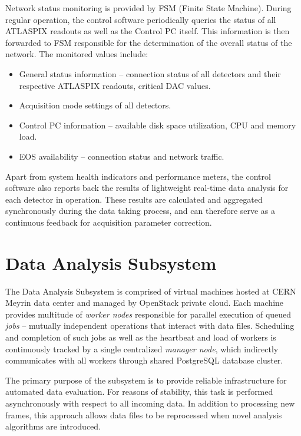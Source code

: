 \documentclass[journal]{IEEEtran}
\begin{document}
Network status monitoring is provided by FSM (Finite State Machine). During regular operation, the control software periodically queries the status of all ATLASPIX readouts as well as the Control PC itself. This information is then forwarded to FSM responsible for the determination of the overall status of the network. The monitored values include:
~
\begin{itemize}
  \item General status information -- connection status of all detectors and their respective ATLASPIX readouts, critical DAC values.
  \item Acquisition mode settings of all detectors.
  \item Control PC information -- available disk space utilization, CPU and memory load.
  \item EOS availability -- connection status and network traffic.
\end{itemize}

Apart from system health indicators and performance meters, the control software also reports back the results of lightweight real-time data analysis for each detector in operation. These results are calculated and aggregated synchronously during the data taking process, and can therefore serve as a continuous feedback for acquisition parameter correction.


\section{\label{sec:analysis}Data Analysis Subsystem}
The Data Analysis Subsystem is comprised of virtual machines hosted at CERN Meyrin data center and managed by OpenStack private cloud. Each machine provides multitude of \textit{worker nodes} responsible for parallel execution of queued \textit{jobs} -- mutually independent operations that interact with data files. Scheduling and completion of such jobs as well as the heartbeat and load of workers is continuously tracked by a single centralized \textit{manager node}, which indirectly communicates with all workers through shared PostgreSQL database cluster.

The primary purpose of the subsystem is to provide reliable infrastructure for automated data evaluation. For reasons of stability, this task is performed asynchronously with respect to all incoming data. In addition to processing new frames, this approach allows data files to be reprocessed when novel analysis algorithms are introduced.
\end{document}
